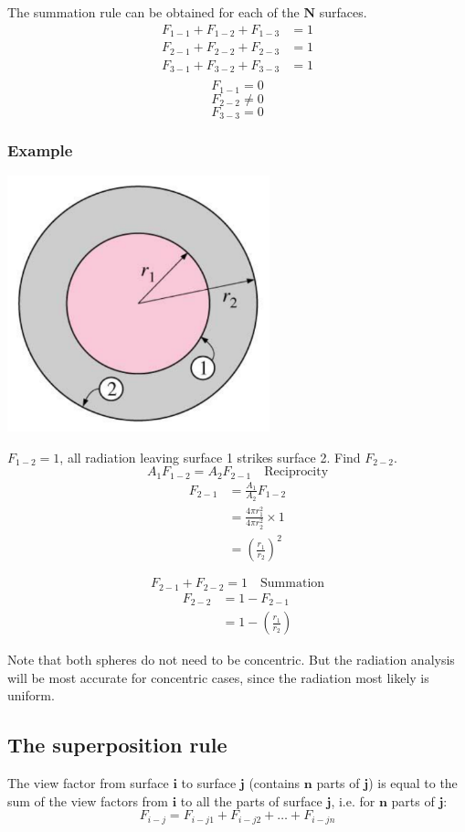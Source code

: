 \documentclass[11pt]{article}
\begin{document}
The summation rule can be obtained for each of the \(\boldsymbol{N}\) surfaces.
\begin{align*}
F_{1-1} + F_{1-2} + F_{1-3} &= 1 \\
F_{2-1} + F_{2-2} + F_{2-3} &= 1 \\
F_{3-1} + F_{3-2} + F_{3-3} &= 1 \\
\end{align*}
\[F_{1-1} = 0\]
\[F_{2-2} \ne 0\]
\[F_{3-3} = 0\]

 \newpage
\subsubsection{Example}
\label{sec:org83e93cc}
\begin{center}
\includegraphics[height=20em]{./images/sphere-enclosed-within-another-sphere-diagram.png}
\end{center}
\(F_{1-2} = 1\), all radiation leaving surface 1 strikes surface 2. Find \(F_{2-2}\).
\[A_1 F_{1-2} = A_2 F_{2-1} \quad \text{Reciprocity}\]
\begin{align*}
F_{2-1} &= \frac{A_1}{A_2} F_{1-2} \\
&= \frac{4 \pi r_1^2}{4 \pi r_2^2} \times 1 \\
&= \left(\frac{r_1}{r_2} \right)^2
\end{align*}

\[F_{2-1} + F_{2-2} = 1 \quad \text{Summation}\]
\begin{align*}
F_{2-2} &= 1 - F_{2-1} \\
&= 1 - \left(\frac{r_1}{r_2} \right)
\end{align*}

Note that both spheres do not need to be concentric. But the radiation analysis will be most accurate for concentric cases, since the radiation most likely is uniform.
\subsection{The superposition rule}
\label{sec:org80e6d3a}
The view factor from surface \(\boldsymbol{i}\) to surface \(\boldsymbol{j}\) (contains \(\boldsymbol{n}\) parts of \(\boldsymbol{j}\)) is equal to the sum of the view factors from \(\boldsymbol{i}\) to all the parts of surface \(\boldsymbol{j}\), i.e. for \(\boldsymbol{n}\) parts of \(\boldsymbol{j}\):
\[F_{i-j} = F_{i-j1} + F_{i-j2} + \ldots + F_{i-jn}\]
\end{document}
